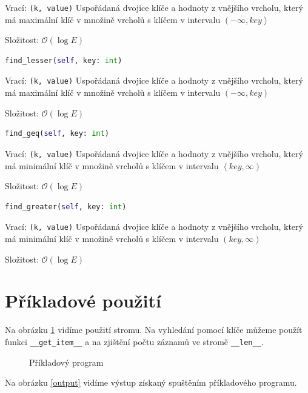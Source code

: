 \documentclass[a4paper,11pt,openany]{article}
\begin{document}
Vrací: \texttt{(k, value)} Uspořádaná dvojice klíče a hodnoty z vnějšího vrcholu, který má maximální klíč v množině vrcholů s klíčem v intervalu $\left( -\infty, key\right\rangle $
	
Složitost: $\mathcal{O}(\log E)$
	
\begin{lstlisting}[language=python,frame=none]
find_lesser(self, key: int)
\end{lstlisting}
	
Vrací: \texttt{(k, value)} Uspořádaná dvojice klíče a hodnoty z vnějšího vrcholu, který má maximální klíč v množině vrcholů s klíčem v intervalu $\left( -\infty, key\right) $
	
Složitost: $\mathcal{O}(\log E)$
	
\begin{lstlisting}[language=python,frame=none]
find_geq(self, key: int)
\end{lstlisting}
	
Vrací: \texttt{(k, value)} Uspořádaná dvojice klíče a hodnoty z vnějšího vrcholu, který má minimální klíč v množině vrcholů s klíčem v intervalu $\left\langle key, \infty \right) $
	
Složitost: $\mathcal{O}(\log E)$
	
\begin{lstlisting}[language=python,frame=none]
find_greater(self, key: int)
\end{lstlisting}
	
Vrací: \texttt{(k, value)} Uspořádaná dvojice klíče a hodnoty z vnějšího vrcholu, který má minimální klíč v množině vrcholů s klíčem v intervalu $\left( key, \infty \right) $
	
Složitost: $\mathcal{O}(\log E)$

\section{Příkladové použití}
Na obrázku \ref{code} vidíme použití stromu. Na vyhledání pomocí klíče můžeme použít funkci \texttt{\_\_get\_item\_\_} a na zjištění počtu záznamů ve stromě \texttt{\_\_len\_\_}.


\begin{figure}[h]

\caption{Příkladový program}
\label{code}
\end{figure}

Na obrázku \ref{output} vidíme výstup získaný spuštěním příkladového programu.
\end{document}
